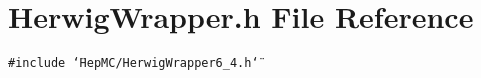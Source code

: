 \section{Herwig\-Wrapper.h File Reference}
\label{HerwigWrapper_8h}
{\tt \#include \char`\"{}Hep\-MC/Herwig\-Wrapper6\_\-4.h\char`\"{}}\par
